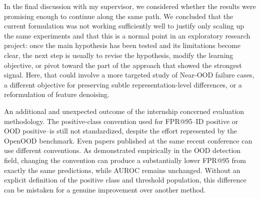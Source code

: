 In the final discussion with my supervisor, we considered whether the results
were promising enough to continue along the same path. We concluded that the
current formulation was not working sufficiently well to justify only scaling
up the same experiments and that this is a normal point in an exploratory research
project: once the main hypothesis has been tested and its limitations become
clear, the next step is usually to revise the hypothesis, modify the learning
objective, or pivot toward the part of the approach that showed the strongest
signal. Here, that could involve a more targeted study of Near-OOD failure
cases, a different objective for preserving subtle representation-level
differences, or a reformulation of feature denoising.

An additional and unexpected outcome of the internship concerned evaluation
methodology. The positive-class convention used for FPR@95--ID positive or
OOD positive--is still not standardized, despite the effort represented by
the OpenOOD benchmark. Even papers published at the same recent conference can
use different conventions. As demonstrated empirically in the OOD detection field,
changing the convention can produce a substantially lower FPR@95 from exactly
the same predictions, while AUROC remains unchanged. Without an explicit
definition of the positive class and threshold population, this difference
can be mistaken for a genuine improvement over another method.

